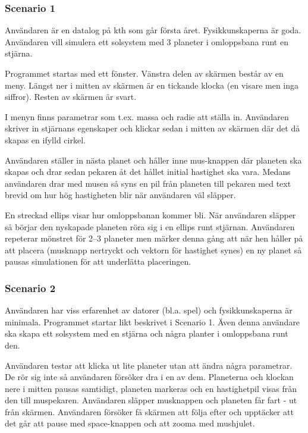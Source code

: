 
\subsubsection{Scenario 1}

Användaren är en datalog på kth som går första året.
Fysikkunskaperna är goda.
Användaren vill simulera ett solsystem med 3 planeter
i omloppsbana runt en stjärna.

Programmet startas med ett fönster.
Vänstra delen av skärmen består av en meny.
Längst ner i mitten av skärmen är en tickande
klocka (en visare men inga siffror).
Resten av skärmen är svart.

I menyn finns parametrar som t.ex. massa och radie att ställa in.
Användaren skriver in stjärnans egenskaper och klickar
sedan i mitten av skärmen där det då skapas en ifylld cirkel.

Användaren ställer in nästa planet och håller inne mus-knappen där
planeten ska skapas och drar sedan pekaren åt det hållet initial
hastighet ska vara.
Medans användaren drar med musen så syns en pil från planeten till
pekaren med text brevid om hur hög hastigheten blir när användaren väl släpper.

En streckad ellips visar hur omloppsbanan kommer bli.
När användaren släpper så börjar den nyskapade planeten röra sig
i en ellips runt stjärnan.
Användaren repeterar mönstret för 2--3 planeter men märker denna gång
att när hen håller på att placera (musknapp nertryckt och vektorn
för hastighet synes) en ny planet så pausas simulationen för att
underlätta placeringen.

\subsubsection{Scenario 2}

Användaren har viss erfarenhet av datorer (bl.a. spel) och
fysikkunskaperna är minimala.
Programmet startar likt beskrivet i Scenario 1.
Även denna användare ska skapa ett solsystem med en stjärna
och några planter i omloppsbana runt den.

Användaren testar att klicka ut lite planeter utan att ändra några parametrar.
De rör sig inte så användaren försöker dra i en av dem.
Planeterna och klockan nere i mitten pausas samtidigt,
planeten markeras och
en hastighetpil visas från den till muspekaren.
Användaren släpper musknappen och planeten får fart - ut från skärmen.
Användaren försöker få skärmen att följa efter och
upptäcker att det går att pause med space-knappen och
att zooma med mushjulet.

